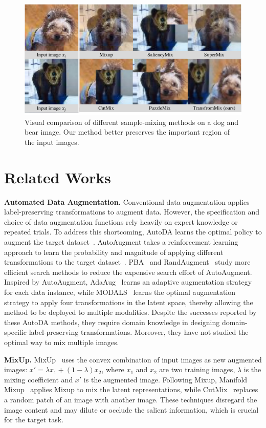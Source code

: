 \documentclass[10pt]{article} %
\begin{document}
\begin{figure}[t]
\centering
\includegraphics[width=0.7\linewidth]{./img/demo.pdf}
\caption{Visual comparison of different sample-mixing methods on a dog and bear image. Our method better preserves the important region of the input images.}
\label{fig:demo}
\end{figure}

\section{Related Works} \label{sec:related_works}
\noindent \textbf{Automated Data Augmentation.} Conventional data augmentation applies label-preserving transformations to augment data. However, the specification and choice of data augmentation functions rely heavily on expert knowledge or repeated trials. To address this shortcoming, AutoDA learns the optimal policy to augment the target dataset~\citep{autoda}. AutoAugment takes a reinforcement learning approach to learn the probability and magnitude of applying different transformations to the target dataset~\citep{aa}. PBA~\citep{pba} and RandAugment~\citep{randaug} study more efficient search methods to reduce the expensive search effort of AutoAugment. Inspired by AutoAugment, AdaAug~\citep{adaaug} learns an adaptive augmentation strategy for each data instance, while MODALS~\citep{modals} learns the optimal augmentation strategy to apply four transformations in the latent space, thereby allowing the method to be deployed to multiple modalities. Despite the successes reported by these AutoDA methods, they require domain knowledge in designing domain-specific label-preserving transformations. Moreover, they have not studied the optimal way to mix multiple images.

\textbf{MixUp.} MixUp~\citep{mixup} uses the convex combination of input images as new augmented images: $x' = \lambda x_1 + (1-\lambda) x_2$, where $x_1$ and $x_2$ are two training images, $\lambda$ is the mixing coefficient and $x'$ is the augmented image. Following Mixup, Manifold Mixup~\citep{manifoldmixup} applies Mixup to mix the latent representations, while CutMix~\citep{cutmix} replaces a random patch of an image with another image. These techniques disregard the image content and may dilute or occlude the salient information, which is crucial for the target task. 
\end{document}
